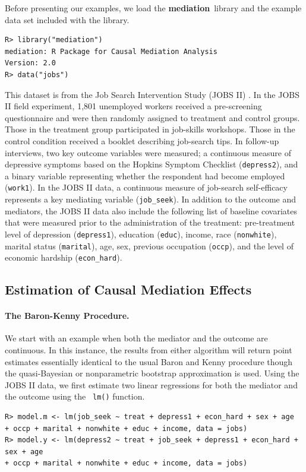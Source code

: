 \documentclass[11pt,letterpaper]{article}
\theoremstyle{plain}
\newcommand\bmediation{{\bf mediation}}
\begin{document}
Before presenting our examples, we load the \bmediation\ library and
the example data set included with the library.
\begin{verbatim}
R> library("mediation")
mediation: R Package for Causal Mediation Analysis
Version: 2.0
R> data("jobs")
\end{verbatim}
This dataset is from the Job Search Intervention Study (JOBS II)
\citep{Vinokur:1997}. In the JOBS II field experiment, 1,801
unemployed workers received a pre-screening questionnaire and were
then randomly assigned to treatment and control groups. Those in the
treatment group participated in job-skills workshops.  Those in the
control condition received a booklet describing job-search tips. In
follow-up interviews, two key outcome variables were measured; a
continuous measure of depressive symptoms based on the Hopkins Symptom
Checklist (\texttt{depress2}), and a binary variable representing
whether the respondent had become employed (\texttt{work1}). In the
JOBS II data, a continuous measure of job-search self-efficacy
represents a key mediating variable (\texttt{job\_seek}). In addition
to the outcome and mediators, the JOBS II data also include the
following list of baseline covariates that were measured prior to the
administration of the treatment: pre-treatment level of depression
(\texttt{depress1}), education (\texttt{educ}), income, race
(\texttt{nonwhite}), marital status (\texttt{marital}), age, sex,
previous occupation (\texttt{occp}), and the level of economic
hardship (\texttt{econ\_hard}).

\subsection{Estimation of Causal Mediation Effects}

\paragraph{The Baron-Kenny Procedure.}
We start with an example when both the mediator and the outcome are
continuous.  In this instance, the results from either algorithm will
return point estimates essentially identical to the usual Baron and
Kenny procedure though the quasi-Bayesian or nonparametric bootstrap
approximation is used.  Using the JOBS II data, we first estimate two
linear regressions for both the mediator and the outcome using the {\tt
lm()} function.
\begin{verbatim}
R> model.m <- lm(job_seek ~ treat + depress1 + econ_hard + sex + age
+ occp + marital + nonwhite + educ + income, data = jobs)
R> model.y <- lm(depress2 ~ treat + job_seek + depress1 + econ_hard + sex + age
+ occp + marital + nonwhite + educ + income, data = jobs)
\end{verbatim}
\end{document}
